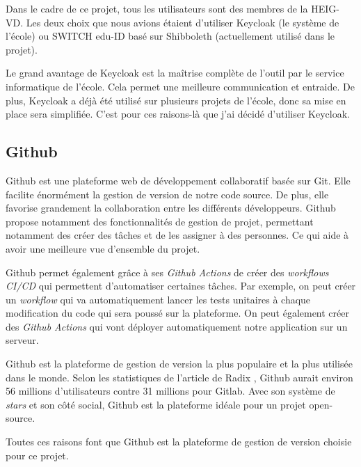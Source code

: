 Dans le cadre de ce projet, tous les utilisateurs sont des membres de la HEIG-VD. Les deux choix que nous avions étaient d'utiliser Keycloak (le système de l'école) ou SWITCH edu-ID basé sur Shibboleth (actuellement utilisé dans le projet).

Le grand avantage de Keycloak est la maîtrise complète de l'outil par le service informatique de l'école. Cela permet une meilleure communication et entraide. De plus, Keycloak a déjà été utilisé sur plusieurs projets de l'école, donc sa mise en place sera simplifiée.
C'est pour ces raisons-là que j'ai décidé d'utiliser Keycloak.

\subsection{Github}
Github est une plateforme web de développement collaboratif basée sur Git. Elle facilite énormément la gestion de version de notre code source. De plus, elle favorise grandement la collaboration entre les différents développeurs. Github propose notamment des fonctionnalités de gestion de projet, permettant notamment des créer des tâches et de les assigner à des personnes. Ce qui aide à avoir une meilleure vue d'ensemble du projet.

Github permet également grâce à ses \emph{Github Actions} de créer des \emph{workflows CI/CD} qui permettent d'automatiser certaines tâches. Par exemple, on peut créer un \emph{workflow} qui va automatiquement lancer les tests unitaires à chaque modification du code qui sera poussé sur la plateforme. On peut également créer des \emph{Github Actions} qui vont déployer automatiquement notre application sur un serveur.

Github est la plateforme de gestion de version la plus populaire et la plus utilisée dans le monde. Selon les statistiques de l'article de Radix \cite{Radix}, Github aurait environ 56 millions d'utilisateurs contre 31 millions pour Gitlab. Avec son système de \emph{stars} et son côté social, Github est la plateforme idéale pour un projet open-source.

Toutes ces raisons font que Github est la plateforme de gestion de version choisie pour ce projet.
\newpage
